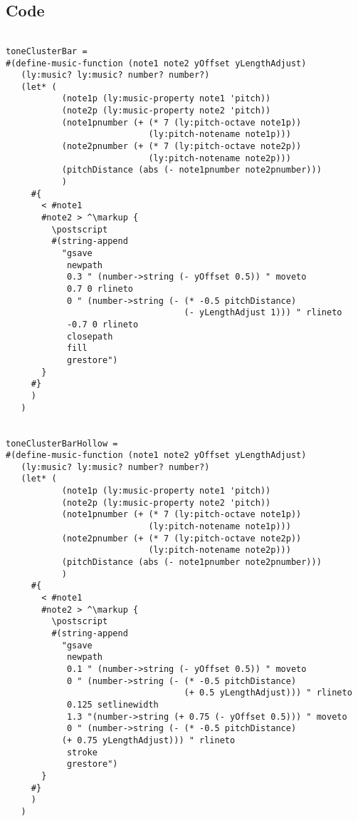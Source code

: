 \subsection{Code}
\begin{verbatim}

toneClusterBar =
#(define-music-function (note1 note2 yOffset yLengthAdjust)
   (ly:music? ly:music? number? number?)
   (let* (
           (note1p (ly:music-property note1 'pitch))
           (note2p (ly:music-property note2 'pitch))
           (note1pnumber (+ (* 7 (ly:pitch-octave note1p))
                            (ly:pitch-notename note1p)))
           (note2pnumber (+ (* 7 (ly:pitch-octave note2p))
                            (ly:pitch-notename note2p)))
           (pitchDistance (abs (- note1pnumber note2pnumber)))
           )
     #{
       < #note1
       #note2 > ^\markup {
         \postscript
         #(string-append
           "gsave
            newpath
            0.3 " (number->string (- yOffset 0.5)) " moveto
            0.7 0 rlineto
            0 " (number->string (- (* -0.5 pitchDistance)
                                   (- yLengthAdjust 1))) " rlineto
            -0.7 0 rlineto
            closepath
            fill
            grestore")
       }
     #}
     )
   )


toneClusterBarHollow =
#(define-music-function (note1 note2 yOffset yLengthAdjust)
   (ly:music? ly:music? number? number?)
   (let* (
           (note1p (ly:music-property note1 'pitch))
           (note2p (ly:music-property note2 'pitch))
           (note1pnumber (+ (* 7 (ly:pitch-octave note1p))
                            (ly:pitch-notename note1p)))
           (note2pnumber (+ (* 7 (ly:pitch-octave note2p))
                            (ly:pitch-notename note2p)))
           (pitchDistance (abs (- note1pnumber note2pnumber)))
           )
     #{
       < #note1
       #note2 > ^\markup {
         \postscript
         #(string-append
           "gsave
            newpath
            0.1 " (number->string (- yOffset 0.5)) " moveto
            0 " (number->string (- (* -0.5 pitchDistance)
                                   (+ 0.5 yLengthAdjust))) " rlineto
            0.125 setlinewidth
            1.3 "(number->string (+ 0.75 (- yOffset 0.5))) " moveto
            0 " (number->string (- (* -0.5 pitchDistance)
           (+ 0.75 yLengthAdjust))) " rlineto
            stroke
            grestore")
       }
     #}
     )
   )



\end{verbatim}

